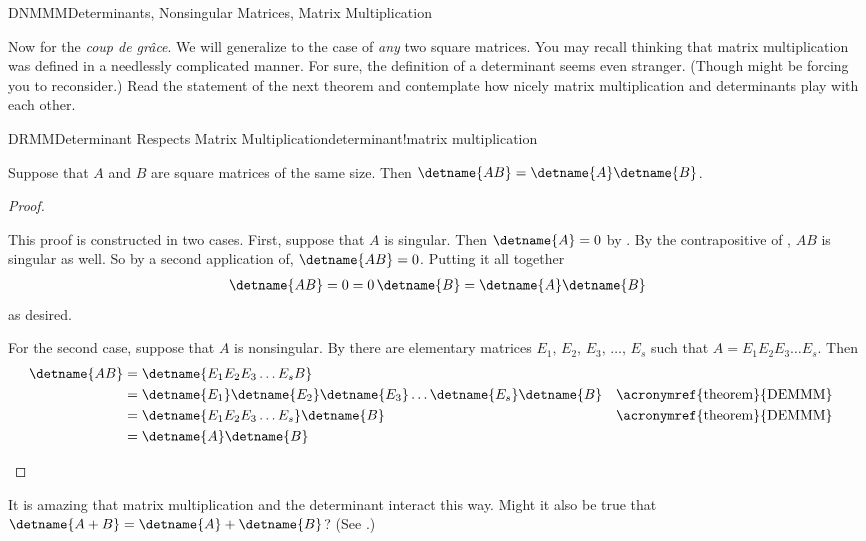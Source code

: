 \begin{subsect}{DNMMM}{Determinants, Nonsingular Matrices, Matrix Multiplication}
%
\begin{para}Now for the {\it coup de gr\^{a}ce}.  We will generalize  to the case of {\em any} two square matrices.   You may recall thinking that matrix multiplication was defined in a needlessly complicated manner.  For sure, the definition of a determinant seems even stranger.  (Though  might be forcing you to reconsider.)  Read the statement of the next theorem and contemplate how nicely matrix multiplication and determinants play with each other.\end{para}
%
\begin{theorem}{DRMM}{Determinant Respects Matrix Multiplication}{determinant!matrix multiplication}
\begin{para}Suppose that $A$ and $B$ are square matrices of the same size.  Then $\detname{AB}=\detname{A}\detname{B}$.\end{para}
\end{theorem}
%
\begin{proof}
\begin{para}This proof is constructed in two cases.  First, suppose that $A$ is singular.  Then $\detname{A}=0$ by .  By the contrapositive of , $AB$ is singular as well.
So by a second application of, $\detname{AB}=0$.  Putting it all together
%
\begin{align*}
\detname{AB}=0=0\,\detname{B}=\detname{A}\detname{B}
\end{align*}
%
as desired.\end{para}
%
\begin{para}For the second case, suppose that $A$ is nonsingular.  By  there are elementary matrices $E_{1},\,E_{2},\,E_{3},\,\dots,\,E_{s}$ such that $A=E_1E_2E_3\dots E_s$.
Then
%
\begin{align*}
\detname{AB}
&=
\detname{E_1E_2E_3\dots E_{s}B}\\
%
&=
\detname{E_1}\detname{E_2}\detname{E_3}\dots\detname{E_s}\detname{B}
&&\text{\acronymref{theorem}{DEMMM}}\\
%
&=
\detname{E_1E_2E_3\dots E_s}\detname{B}
&&\text{\acronymref{theorem}{DEMMM}}\\
%
&=
\detname{A}\detname{B}
%
\end{align*}
\end{para}
%
\end{proof}
%
\begin{para}It is amazing that matrix multiplication and the determinant interact this way.  Might it also be true that $\detname{A+B}=\detname{A}+\detname{B}$?  (See .)\end{para}
%
%
%
\end{subsect}
%
